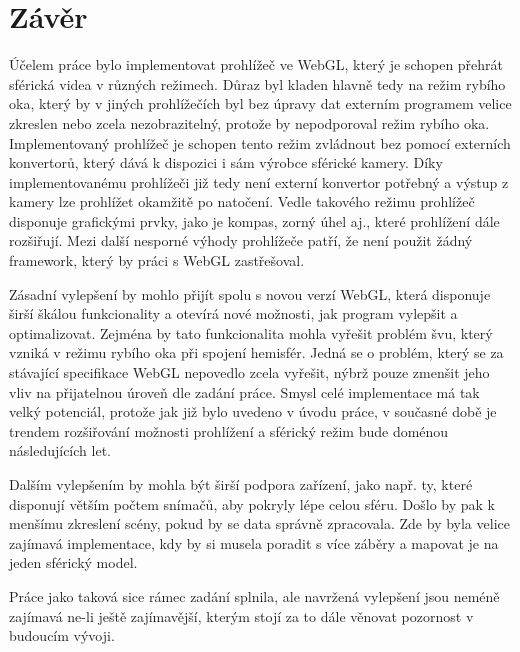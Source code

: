 \chapter{Závěr}
\label{chapter:6}

Účelem práce bylo implementovat prohlížeč ve WebGL, který je schopen přehrát sférická videa v různých režimech. Důraz byl kladen hlavně tedy na režim rybího oka, který by v jiných prohlížečích byl bez úpravy dat externím programem velice zkreslen nebo zcela nezobrazitelný, protože by nepodporoval režim rybího oka. Implementovaný prohlížeč je schopen tento režim zvládnout bez pomocí externích konvertorů, který dává k dispozici i sám výrobce sférické kamery. Díky implementovanému prohlížeči již tedy není externí konvertor potřebný a výstup z kamery lze prohlížet okamžitě po natočení. Vedle takového režimu prohlížeč disponuje grafickými prvky, jako je kompas, zorný úhel aj., které prohlížení dále rozšiřují. Mezi další nesporné výhody prohlížeče patří, že není použit žádný framework, který by práci s WebGL zastřešoval.


Zásadní vylepšení by mohlo přijít spolu s novou verzí WebGL, která  disponuje širší škálou funkcionality a otevírá nové možnosti, jak program vylepšit a optimalizovat. Zejména by tato funkcionalita mohla vyřešit problém švu, který vzniká v režimu rybího oka při spojení hemisfér. Jedná se o problém, který se za stávající specifikace WebGL nepovedlo zcela vyřešit, nýbrž pouze zmenšit jeho vliv na přijatelnou úroveň dle zadání práce. Smysl celé implementace má tak velký potenciál, protože jak již bylo uvedeno v úvodu práce, v současné době je trendem  rozšiřování možnosti prohlížení a sférický režim bude doménou následujících let. 

Dalším vylepšením by mohla být širší podpora zařízení, jako např. ty, které disponují větším počtem snímačů, aby pokryly lépe celou sféru. Došlo by pak k menšímu zkreslení scény, pokud by se data správně zpracovala. Zde by byla velice zajímavá implementace, kdy  by si musela poradit s více záběry a mapovat je na jeden sférický model.

Práce jako taková sice rámec zadání splnila, ale navržená vylepšení jsou neméně zajímavá ne-li ještě zajímavější, kterým stojí za to dále věnovat pozornost v budoucím vývoji.



 
 
 


